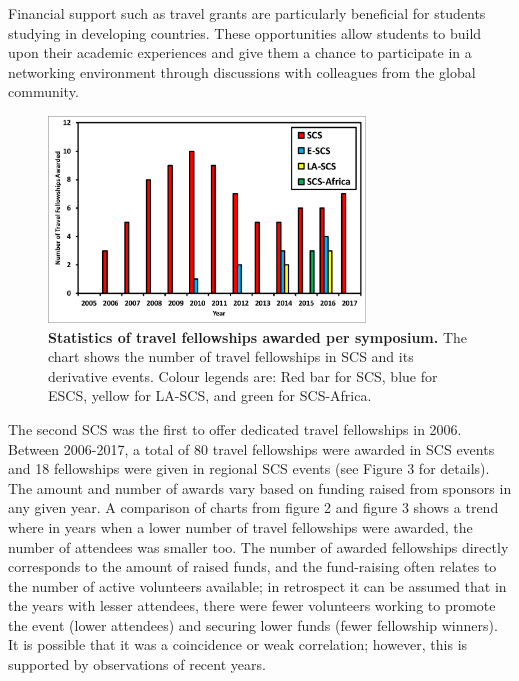 \documentclass[]{article}%
\begin{document}
	Financial support such as travel grants are particularly beneficial for students studying in developing countries. These opportunities allow students to build upon their academic experiences and give them a chance to participate in a networking environment through discussions with colleagues from the global community.\\
	
	
	
	\begin{figure}
		\centering
		\includegraphics[width=0.75\textwidth]{figure3.pdf}
		\caption{\textbf{Statistics of travel fellowships awarded per symposium.} The chart shows the number of travel fellowships in SCS and its derivative events. Colour legends are: Red bar for SCS, blue for ESCS, yellow for LA-SCS, and  green for SCS-Africa.
		}
	\end{figure}
	
	The second SCS was the first to offer dedicated travel fellowships in 2006. Between 2006-2017, a total of 80  travel fellowships were awarded in SCS events and 18  fellowships were given in regional SCS events (see Figure 3 for details).\\
	The amount and number of awards vary based on funding raised from sponsors in any given year. A comparison of charts from figure 2 and figure 3 shows a trend where in years when a lower number of travel fellowships were awarded, the number of attendees was smaller too. The number of awarded fellowships directly corresponds to the amount of raised funds, and the fund-raising often relates to the number of active volunteers available; in retrospect it can be assumed that in the years with lesser attendees, there were fewer volunteers working to promote the event (lower attendees) and securing lower funds (fewer fellowship winners). It is possible that it was a coincidence or weak correlation; however, this is supported by observations of recent years.  \\
	
\end{document}
